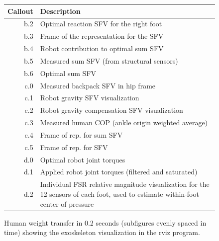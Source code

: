 \begin{figure}[htbp]
\begin{tabular}[t]{rl}
 		\bottomrule
 	\end{tabular}%
	\begin{tabular}[t]{rl}
 	\toprule
 	Callout & Description\\
 	\midrule
 	b.2 & Optimal reaction SFV for the right foot\\
 		b.3 & Frame of the representation for the \ta{inter-foot} SFV\\
 		b.4 & Robot contribution to optimal sum SFV \\
 		b.5 & Measured sum SFV (from structural sensors)\\
 		b.6 & Optimal sum SFV\\
 		c.0 & Measured backpack SFV in hip frame\\
 		c.1 & Robot gravity SFV visualization \\
 		c.2 & Robot gravity compensation SFV visualization\\
 		c.3 & Measured human COP (ankle origin weighted average) \\
 		c.4 & Frame of rep. for sum SFV \\
 		c.5 & Frame of rep. for \ta{inter-foot} SFV\\
 		d.0 & Optimal robot joint torques \\
 		d.1 & Applied robot joint torques (filtered and saturated) \\
 		d.2 & \begin{minipage}{2.75in}Individual FSR relative magnitude visualization for the 12 sensors of each foot, used to estimate within-foot center of pressure\end{minipage} \\
 		\bottomrule
 	\end{tabular}%
 	
 	\caption{Human weight transfer in 0.2 seconds (subfigures evenly spaced in time) showing the exoskeleton visualization in the rviz program.}\label{fig:transitions}
 \end{figure}
 
